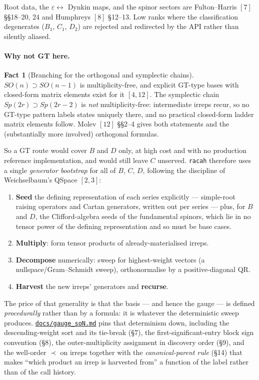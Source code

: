 \documentclass[11pt,a4paper]{article}
\theoremstyle{plain}
\theoremstyle{definition}
\newtheorem{fact}[theorem]{Fact}
\newcommand{\code}[1]{\texttt{#1}}
\newcommand{\gaugeson}{\href{https://github.com/Ryo-wtnb11/racah/blob/main/docs/gauge_soN.md}{\code{docs/gauge\_soN.md}}}
\begin{document}
Root data, the $\varepsilon\leftrightarrow$ Dynkin maps, and the spinor sectors
are Fulton--Harris $[7]$ \S\S18--20, 24 and Humphreys $[8]$ \S12--13. Low ranks
where the classification degenerates ($B_1$, $C_1$, $D_2$) are rejected and
redirected by the API rather than silently aliased.

\paragraph{Why not GT here.}

\begin{fact}[Branching for the orthogonal and symplectic chains]
\label{fact:bcdbranch}
$SO(n)\supset SO(n-1)$ is multiplicity-free, and explicit GT-type bases with
closed-form matrix elements exist for it $[4,12]$. The symplectic chain
$Sp(2r)\supset Sp(2r-2)$ is \emph{not} multiplicity-free: intermediate irreps
recur, so no GT-type pattern labels states uniquely there, and no practical
closed-form ladder matrix elements follow. Molev $[12]$ \S\S2--4 gives both
statements and the (substantially more involved) orthogonal formulas.
\end{fact}

So a GT route would cover $B$ and $D$ only, at high cost and with no production
reference implementation, and would still leave $C$ unserved. \code{racah}
therefore uses a single \emph{generator bootstrap} for all of $B$, $C$, $D$,
following the discipline of Weichselbaum's QSpace $[2,3]$:

\begin{enumerate}[leftmargin=1.9em]
  \item \textbf{Seed} the defining representation of each series explicitly ---
    simple-root raising operators and Cartan generators, written out per series
    --- plus, for $B$ and $D$, the Clifford-algebra seeds of the fundamental
    spinors, which lie in no tensor power of the defining representation and so
    must be base cases.
  \item \textbf{Multiply}: form tensor products of already-materialised irreps.
  \item \textbf{Decompose} numerically: sweep for highest-weight vectors (a
    nullspace/Gram--Schmidt sweep), orthonormalise by a positive-diagonal QR.
  \item \textbf{Harvest} the new irreps' generators and \textbf{recurse}.
\end{enumerate}

The price of that generality is that the basis --- and hence the gauge --- is
defined \emph{procedurally} rather than by a formula: it is whatever the
deterministic sweep produces. \gaugeson{} pins that determinism down, including
the descending-weight sort and its tie-break (\S7), the first-significant-entry
block sign convention (\S8), the outer-multiplicity assignment in discovery
order (\S9), and the well-order $\prec$ on irreps together with the
\emph{canonical-parent rule} (\S14) that makes ``which product an irrep is
harvested from'' a function of the label rather than of the call history.
\end{document}
